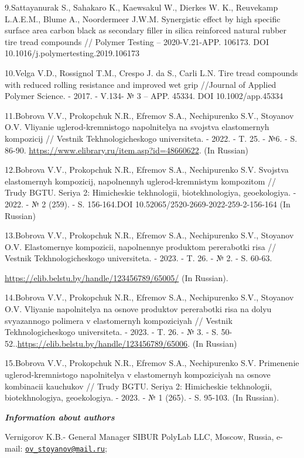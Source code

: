9.Sattayanurak S., Sahakaro K., Kaewsakul W., Dierkes W. K., Reuvekamp
L.A.E.M., Blume A., Noordermeer J.W.M. Synergistic effect by high
specific surface area carbon black as secondary filler in silica
reinforced natural rubber tire tread compounds // Polymer Testing --
2020-V.21-APP. 106173. DOI 10.1016/j.polymertesting.2019.106173

10.Velga V.D., Rossignol T.M., Crespo J. da S., Carli L.N. Tire tread
compounds with reduced rolling resistance and improved wet grip
//Journal of Applied Polymer Science. - 2017. - V.134- № 3 -- APP.
45334. DOI 10.1002/app.45334

11.Bobrova V.V., Prokopchuk N.R., Efremov S.A., Nechipurenko S.V.,
Stoyanov O.V. Vliyanie uglerod-kremnistogo napolnitelya na svojstva
elastomernyh kompozicij // Vestnik Tekhnologicheskogo universiteta. -
2022. - T. 25. - №6. - S. 86-90.
\url{https://www.elibrary.ru/item.asp?id=48660622}. (In Russian)

12.Bobrova V.V., Prokopchuk N.R., Efremov S.A., Nechipurenko S.V.
Svojstva elastomernyh kompozicij, napolnennyh uglerod-kremnistym
kompozitom // Trudy BGTU. Seriya 2: Himicheskie tekhnologii,
biotekhnologiya, geoekologiya. - 2022. - № 2 (259). - S. 156-164.DOI
10.52065/2520-2669-2022-259-2-156-164 (In Russian)

13.Bobrova V.V., Prokopchuk N.R., Efremov S.A., Nechipurenko S.V.,
Stoyanov O.V. Elastomernye kompozicii, napolnennye produktom pererabotki
risa // Vestnik Tekhnologicheskogo universiteta. - 2023. - T. 26. - № 2.
- S. 60-63.

\url{https://elib.belstu.by/handle/123456789/65005/} (In Russian).

14.Bobrova V.V., Prokopchuk N.R., Efremov S.A., Nechipurenko S.V.,
Stoyanov O.V. Vliyanie napolnitelya na osnove produktov pererabotki risa
na dolyu svyazannogo polimera v elastomernyh kompoziciyah // Vestnik
Tekhnologicheskogo universiteta. - 2023. - T. 26. - № 3. - S.
50-52..\url{https://elib.belstu.by/handle/123456789/65006}. (In Russian)

15.Bobrova V.V., Prokopchuk N.R., Efremov S.A., Nechipurenko S.V.
Primenenie uglerod-kremnistogo napolnitelya v elastomernyh kompoziciyah
na osnove kombinacii kauchukov // Trudy BGTU. Seriya 2: Himicheskie
tekhnologii, biotekhnologiya, geoekologiya. - 2023. - № 1 (265). - S.
95-103. (In Russian).

\emph{{\bfseries Information about authors}}

Vernigorov K.B.- General Manager SIBUR PolyLab LLC, Moscow, Russia,
e-mail:
\href{mailto:ov_stoyanov@mail.ru}{\nolinkurl{ov\_stoyanov@mail.ru}};


